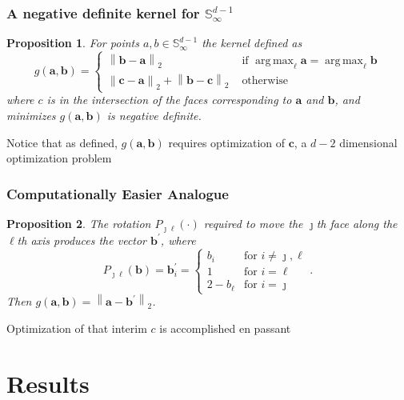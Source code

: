 \documentclass[aspectratio=169]{beamer}
\newcommand{\norm}[1]{\left\lVert #1 \right\rVert}
\newcommand{\pnorm}[2]{\norm{#1}_{#2}}
\newtheorem{prop}{Proposition}
\DeclareMathOperator*{\argmax}{arg\,max}
\begin{document}
\begin{frame}
  \frametitle{A negative definite kernel for ${\mathbb S}_{\infty}^{d-1}$}
  \begin{prop}
    For points $a,b \in {\mathbb S}_{\infty}^{d-1}$ the kernel defined as
    \[
      g(\bm{a},\bm{b}) = \begin{cases}
        \pnorm{\bm{b}-\bm{a}}{2} &\text{ if }\argmax_{\ell}\bm{a} =
        \argmax_{\ell}\bm{b}\\
        \pnorm{\bm{c}-\bm{a}}{2} + \pnorm{\bm{b}-\bm{c}}{2} &\text{ otherwise}
      \end{cases}
    \]
    where $c$ is in the intersection of the faces corresponding to $\bm{a}$
    and $\bm{b}$, and minimizes $g(\bm{a},\bm{b})$ is negative definite.
  \end{prop}
  Notice that as defined, $g(\bm{a},\bm{b})$ requires optimization of $\bm{c}$,
    a $d-2$ dimensional optimization problem
\end{frame}

\begin{frame}
  \frametitle{Computationally Easier Analogue}
  \begin{prop}
    The rotation
    $P_{\jmath\ell}(\cdot)$ required to move the $\jmath$th face
    along the $\ell$th axis produces the vector $\bm{b}^\prime$, where
      \begin{equation}
        \label{eqn:rotation}
        P_{\jmath\ell}(\bm{b}) = \bm{b}^{\prime}_i =
        \begin{cases}
            b_{i} &\text{for }i\neq \jmath,\ell\\
            1 &\text{for }i = \ell\\
            2 - b_{\ell} &\text{for }i = \jmath
        \end{cases}.
      \end{equation}
      Then $g(\bm{a},\bm{b}) = \pnorm{\bm{a} - \bm{b}^{\prime}}{2}$.
  \end{prop}
  Optimization of that interim $c$ is accomplished en passant
\end{frame}

\section{Results}
\end{document}
